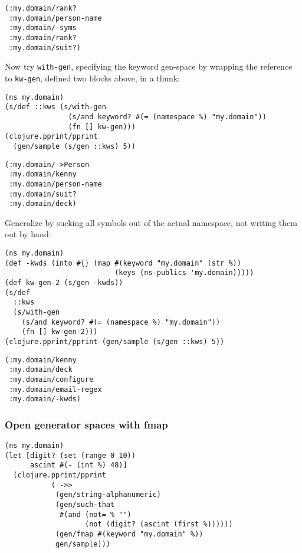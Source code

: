 \documentclass[10pt,oneside,x11names]{article}
\begin{document}
\begin{verbatim}
(:my.domain/rank?
 :my.domain/person-name
 :my.domain/-syms
 :my.domain/rank?
 :my.domain/suit?)
\end{verbatim}


Now try \texttt{with-gen}, specifying the keyword gen-space by wrapping the
reference to \texttt{kw-gen}, defined two blocks above, in a thunk:

\begin{verbatim}
(ns my.domain)
(s/def ::kws (s/with-gen
               (s/and keyword? #(= (namespace %) "my.domain"))
               (fn [] kw-gen)))
(clojure.pprint/pprint
  (gen/sample (s/gen ::kws) 5))
\end{verbatim}

\begin{verbatim}
(:my.domain/->Person
 :my.domain/kenny
 :my.domain/person-name
 :my.domain/suit?
 :my.domain/deck)
\end{verbatim}


Generalize by sucking all symbols out of the actual namespace, not writing them
out by hand:

\begin{verbatim}
(ns my.domain)
(def -kwds (into #{} (map #(keyword "my.domain" (str %))
                          (keys (ns-publics 'my.domain)))))
(def kw-gen-2 (s/gen -kwds))
(s/def
  ::kws
  (s/with-gen
    (s/and keyword? #(= (namespace %) "my.domain"))
    (fn [] kw-gen-2)))
(clojure.pprint/pprint (gen/sample (s/gen ::kws) 5))
\end{verbatim}

\begin{verbatim}
(:my.domain/kenny
 :my.domain/deck
 :my.domain/configure
 :my.domain/email-regex
 :my.domain/-kwds)
\end{verbatim}

\subsubsection{Open generator spaces with fmap}
\label{sec:org9dc18bc}

\begin{verbatim}
(ns my.domain)
(let [digit? (set (range 0 10))
      ascint #(- (int %) 48)]
  (clojure.pprint/pprint
           ( ->>
            (gen/string-alphanumeric)
            (gen/such-that
             #(and (not= % "")
                   (not (digit? (ascint (first %))))))
            (gen/fmap #(keyword "my.domain" %))
            gen/sample)))
\end{verbatim}
\end{document}
